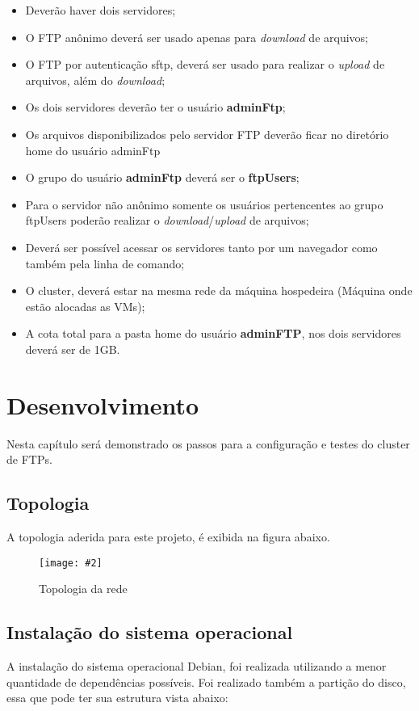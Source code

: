 \documentclass[
	12pt,				%
	openright,			%
	twoside,			%
	openany,			%
	a4paper,			%
	chapter=TITLE,		%
	section=TITLE,		%
	subsection=TITLE,	%
	subsubsection=TITLE,%
	english,
	brazil				%
]{abntex2}
\newcommand{\includeImage}[3] {

\begin{figure}[H]
 	 \centering
  		\texttt{[image: \#2]}
  	\caption{#3}
\end{figure}

}
\begin{document}
\begin{itemize}
	\item Deverão haver dois servidores;
	\item O FTP anônimo deverá ser usado apenas para \textit{download} de arquivos; 
	\item O FTP por autenticação sftp, deverá ser usado para realizar o \textit{upload} de arquivos, além do \textit{download};
	\item Os dois servidores deverão ter o usuário \textbf{adminFtp};
	\item Os arquivos disponibilizados pelo servidor FTP deverão ficar no diretório home do usuário adminFtp
	\item O grupo do usuário \textbf{adminFtp} deverá ser o \textbf{ftpUsers};
	\item Para o servidor não anônimo somente os usuários pertencentes ao grupo ftpUsers poderão realizar o \textit{download}/\textit{upload} de arquivos;
	\item Deverá ser possível acessar os servidores tanto por um navegador como também pela linha de comando;
	\item O cluster, deverá estar na mesma rede da máquina hospedeira (Máquina onde estão alocadas as VMs); 
	\item A cota total para a pasta home do usuário \textbf{adminFTP}, nos dois servidores deverá ser de 1GB.
\end{itemize}

\chapter{Desenvolvimento}

Nesta capítulo será demonstrado os passos para a configuração e testes do cluster de FTPs.

\section{Topologia}

A topologia aderida para este projeto, é exibida na figura abaixo.

\includeImage{0.5}{../imgs/topologia.png}{Topologia da rede}

\section{Instalação do sistema operacional}

A instalação do sistema operacional Debian, foi realizada utilizando a menor quantidade de dependências possíveis. Foi realizado também a partição do disco, essa que pode ter sua estrutura vista abaixo:
\end{document}
